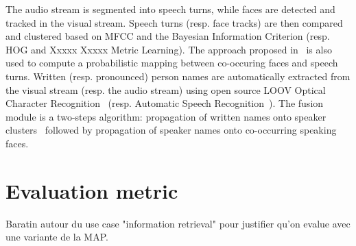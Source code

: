 \documentclass{acm_proc_article-me}
\begin{document}

The audio stream is segmented into speech turns, while faces are detected and tracked in the visual stream.
Speech turns (resp. face tracks) are then compared and clustered based on MFCC and the Bayesian Information Criterion (resp. HOG and Xxxxx Xxxxx Metric Learning). The approach proposed in~\cite{POIGNANT--MTAP--2015} is also used to compute a probabilistic mapping between co-occuring faces and speech turns. Written (resp. pronounced) person names are automatically extracted from the visual stream (resp. the audio stream) using open source LOOV Optical Character Recognition~\cite{POIGNANT--ICME--2012} (resp. Automatic Speech Recognition~\cite{REF}). The fusion module is a two-steps algorithm: propagation of written names onto speaker clusters~\cite{POIGNANT--INTERSPEECH--2012} followed by propagation of speaker names onto co-occurring speaking faces.

\section{Evaluation metric}
\label{sec:metric}

Baratin autour du use case "information retrieval" pour justifier qu'on evalue
avec une variante de la MAP.
\end{document}
